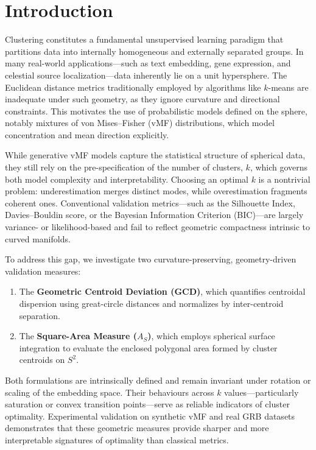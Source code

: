 \documentclass[12pt,a4paper]{report}
\begin{document}
\section{Introduction}
Clustering constitutes a fundamental unsupervised learning paradigm that partitions data into internally homogeneous and externally separated groups. In many real-world applications—such as text embedding, gene expression, and celestial source localization—data inherently lie on a unit hypersphere. The Euclidean distance metrics traditionally employed by algorithms like $k$-means are inadequate under such geometry, as they ignore curvature and directional constraints. This motivates the use of probabilistic models defined on the sphere, notably mixtures of von Mises–Fisher (vMF) distributions, which model concentration and mean direction explicitly.

While generative vMF models capture the statistical structure of spherical data, they still rely on the pre-specification of the number of clusters, $k$, which governs both model complexity and interpretability. Choosing an optimal $k$ is a nontrivial problem: underestimation merges distinct modes, while overestimation fragments coherent ones. Conventional validation metrics—such as the Silhouette Index, Davies–Bouldin score, or the Bayesian Information Criterion (BIC)—are largely variance- or likelihood-based and fail to reflect geometric compactness intrinsic to curved manifolds.

To address this gap, we investigate two curvature-preserving, geometry-driven validation measures:
\begin{enumerate}
    \item The \textbf{Geometric Centroid Deviation (GCD)}, which quantifies centroidal dispersion using great-circle distances and normalizes by inter-centroid separation.
    \item The \textbf{Square-Area Measure ($A_S$)}, which employs spherical surface integration to evaluate the enclosed polygonal area formed by cluster centroids on $S^2$.
\end{enumerate}
Both formulations are intrinsically defined and remain invariant under rotation or scaling of the embedding space. Their behaviours across $k$ values—particularly saturation or convex transition points—serve as reliable indicators of cluster optimality. Experimental validation on synthetic vMF and real GRB datasets demonstrates that these geometric measures provide sharper and more interpretable signatures of optimality than classical metrics.
\end{document}
